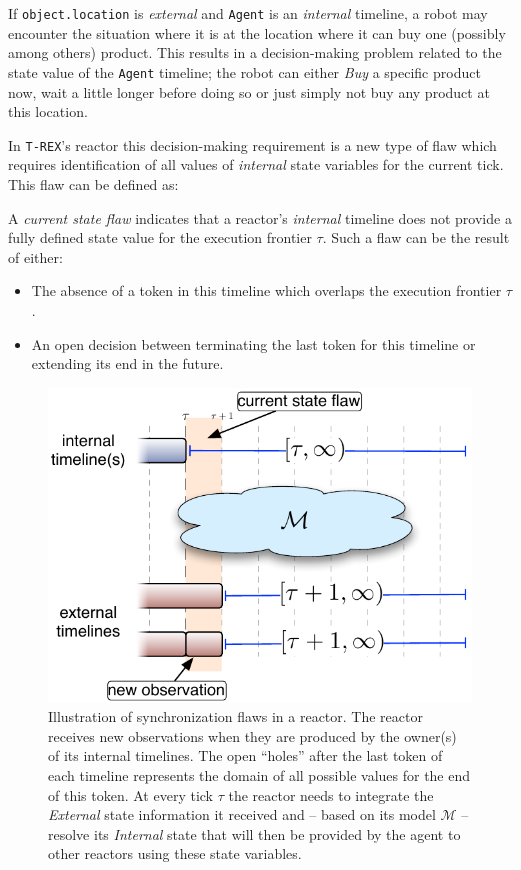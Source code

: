 If \texttt{object.location} is {\em external} and \texttt{Agent} is an
{\em internal} timeline, a robot may encounter the situation where it
is at the location where it can buy one (possibly among others)
product. This results in a decision-making problem related to the
state value of the \texttt{Agent} timeline; the robot can either {\em
  Buy} a specific product now, wait a little longer before doing so or
just simply not buy any product at this location.

In \texttt{T-REX}'s \eu reactor this decision-making requirement is a
new type of flaw which requires identification of all values of {\em
  internal} state variables for the current tick. This flaw can be
defined as:

\begin{definition}
  \label{def:csf}
  A {\em current state flaw} indicates that a reactor's {\em internal}
  timeline does not provide a fully defined state value for the
  execution frontier $\tau$. Such a flaw can be the result of either:

  \begin{itemize}
  \item The absence of a token in this timeline which overlaps the
    execution frontier $\tau$.
  \item An open decision between terminating the last token for this
    timeline or extending its end in the future.
  \end{itemize}

\end{definition} 

\begin{figure}[!htbp]
  \centering
  \includegraphics[width=0.5\columnwidth]{figs/synch-relation}
  \caption{\small Illustration of synchronization flaws in a
    reactor. The reactor receives new observations when they are
    produced by the owner(s) of its internal timelines. The open
    ``holes'' after the last token of each timeline represents the
    domain of all possible values for the end of this token. At every
    tick $\tau$ the reactor needs to integrate the {\em External}
    state information it received and -- based on its model
    $\mathcal{M}$ -- resolve its {\em Internal} state that will then
    be provided by the agent to other reactors using these state
    variables.}
  \label{fig:synch:flaw}
\end{figure}



